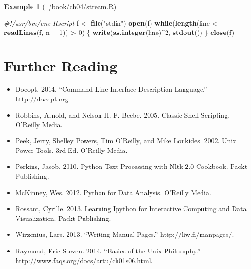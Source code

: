 \documentclass[
]{book}
\newenvironment{Shaded}{\begin{snugshade}}{\end{snugshade}}
\newcommand{\CommentTok}[1]{\textcolor[rgb]{0.56,0.35,0.01}{\textit{#1}}}
\newcommand{\ControlFlowTok}[1]{\textcolor[rgb]{0.13,0.29,0.53}{\textbf{#1}}}
\newcommand{\DataTypeTok}[1]{\textcolor[rgb]{0.13,0.29,0.53}{#1}}
\newcommand{\DecValTok}[1]{\textcolor[rgb]{0.00,0.00,0.81}{#1}}
\newcommand{\KeywordTok}[1]{\textcolor[rgb]{0.13,0.29,0.53}{\textbf{#1}}}
\newcommand{\NormalTok}[1]{#1}
\newcommand{\OperatorTok}[1]{\textcolor[rgb]{0.81,0.36,0.00}{\textbf{#1}}}
\newcommand{\StringTok}[1]{\textcolor[rgb]{0.31,0.60,0.02}{#1}}
\providecommand{\tightlist}{%
  \setlength{\itemsep}{0pt}\setlength{\parskip}{0pt}}
\theoremstyle{definition}
\theoremstyle{definition}
\newtheorem{example}{Example}[chapter]
\theoremstyle{definition}
\theoremstyle{remark}
\begin{document}
\begin{example}[~/book/ch04/stream.R]
\protect\hypertarget{exm:stream-r}{}{\label{exm:stream-r} {} }
\end{example}

\begin{Shaded}
\begin{Highlighting}[]
\CommentTok{#!/usr/bin/env Rscript}
\NormalTok{f <-}\StringTok{ }\KeywordTok{file}\NormalTok{(}\StringTok{"stdin"}\NormalTok{)}
\KeywordTok{open}\NormalTok{(f)}
\ControlFlowTok{while}\NormalTok{(}\KeywordTok{length}\NormalTok{(line <-}\StringTok{ }\KeywordTok{readLines}\NormalTok{(f, }\DataTypeTok{n =} \DecValTok{1}\NormalTok{)) }\OperatorTok{>}\StringTok{ }\DecValTok{0}\NormalTok{) \{}
        \KeywordTok{write}\NormalTok{(}\KeywordTok{as.integer}\NormalTok{(line)}\OperatorTok{^}\DecValTok{2}\NormalTok{, }\KeywordTok{stdout}\NormalTok{())}
\NormalTok{\}}
\KeywordTok{close}\NormalTok{(f)}
\end{Highlighting}
\end{Shaded}

\hypertarget{further-reading}{%
\section{Further Reading}\label{further-reading}}

\begin{itemize}
\tightlist
\item
  Docopt. 2014. ``Command-Line Interface Description Language.'' http://docopt.org.
\item
  Robbins, Arnold, and Nelson H. F. Beebe. 2005. Classic Shell Scripting. O'Reilly Media.
\item
  Peek, Jerry, Shelley Powers, Tim O'Reilly, and Mike Loukides. 2002. Unix Power Tools. 3rd Ed. O'Reilly Media.
\item
  Perkins, Jacob. 2010. Python Text Processing with Nltk 2.0 Cookbook. Packt Publishing.
\item
  McKinney, Wes. 2012. Python for Data Analysis. O'Reilly Media.
\item
  Rossant, Cyrille. 2013. Learning Ipython for Interactive Computing and Data Visualization. Packt Publishing.
\item
  Wirzenius, Lars. 2013. ``Writing Manual Pages.'' http://liw.fi/manpages/.
\item
  Raymond, Eric Steven. 2014. ``Basics of the Unix Philosophy.'' http://www.faqs.org/docs/artu/ch01s06.html.
\end{itemize}
\end{document}
